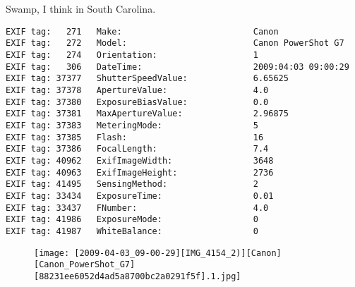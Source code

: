 \section{\protect{}}
\noindent Swamp, I think in South Carolina.
\noindent
\begin{lstlisting}
EXIF tag:   271   Make:                          Canon
EXIF tag:   272   Model:                         Canon PowerShot G7
EXIF tag:   274   Orientation:                   1
EXIF tag:   306   DateTime:                      2009:04:03 09:00:29
EXIF tag: 37377   ShutterSpeedValue:             6.65625
EXIF tag: 37378   ApertureValue:                 4.0
EXIF tag: 37380   ExposureBiasValue:             0.0
EXIF tag: 37381   MaxApertureValue:              2.96875
EXIF tag: 37383   MeteringMode:                  5
EXIF tag: 37385   Flash:                         16
EXIF tag: 37386   FocalLength:                   7.4
EXIF tag: 40962   ExifImageWidth:                3648
EXIF tag: 40963   ExifImageHeight:               2736
EXIF tag: 41495   SensingMethod:                 2
EXIF tag: 33434   ExposureTime:                  0.01
EXIF tag: 33437   FNumber:                       4.0
EXIF tag: 41986   ExposureMode:                  0
EXIF tag: 41987   WhiteBalance:                  0

\end{lstlisting}
\clearpage
\begin{figure}
\raggedleft
\texttt{[image: [2009-04-03\_09-00-29][IMG\_4154\_2)][Canon][Canon\_PowerShot\_G7][88231ee6052d4ad5a8700bc2a0291f5f].1.jpg]}
\end{figure}


\clearpage
